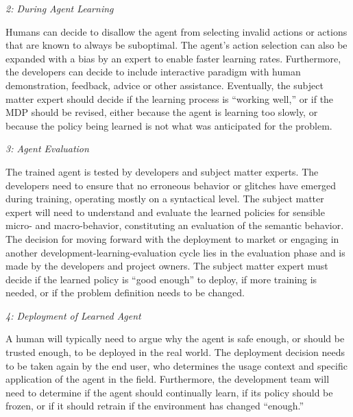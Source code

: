 \documentclass[twoside,11pt]{article}
\begin{document}
\emph{2: During Agent Learning}

Humans can decide to disallow the agent from selecting invalid actions or actions that are known to always be suboptimal. The agent's action selection can also be expanded with a bias by an expert to  enable faster learning rates. Furthermore, the developers can decide to include interactive paradigm with human demonstration, feedback, advice or other assistance.
Eventually, the subject matter expert should decide if the learning process is ``working well,'' or if the MDP should be revised, either because the agent is learning too slowly, or because the policy being learned is not what was anticipated for the problem.
\vspace{2mm}

\emph{3: Agent Evaluation}

The trained agent is tested by developers and subject matter experts.
The developers need to ensure that no erroneous behavior or glitches have emerged during training, operating mostly on a syntactical level. The subject matter expert will need to understand and evaluate the learned policies for sensible micro- and macro-behavior, constituting an evaluation of the semantic behavior. The decision for moving forward with the deployment to market or engaging in another development-learning-evaluation cycle lies in the evaluation phase and is made by the developers and project owners. The subject matter expert must decide if the learned policy is ``good enough'' to deploy, if more training is needed, or if the problem definition needs to be changed. 
\vspace{2mm}

\emph{4: Deployment of Learned Agent}

A human will typically need to argue why the agent is safe enough, or should be trusted enough, to be deployed in the real world. The deployment decision needs to be taken again by the end user, who determines the usage context and specific application of the agent in the field. Furthermore, the development team will need to determine if the agent should continually learn, if its policy should be frozen, or if it should retrain if the environment has changed ``enough.'' 
\vspace{2mm}
\end{document}

